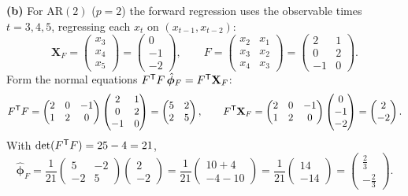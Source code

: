 \documentclass[11pt]{article}
\begin{document}
\textbf{(b)} For $\mathrm{AR}(2)$ ($p=2$) the forward regression uses the
observable times $t=3,4,5$, regressing each $x_t$ on $(x_{t-1},x_{t-2})$:
\[
\mathbf X_F=\begin{pmatrix}x_3\\ x_4\\ x_5\end{pmatrix}=\begin{pmatrix}0\\ -1\\ -2\end{pmatrix},
\qquad
F=\begin{pmatrix}x_2 & x_1\\ x_3 & x_2\\ x_4 & x_3\end{pmatrix}
=\begin{pmatrix}2 & 1\\ 0 & 2\\ -1 & 0\end{pmatrix}.
\]
Form the normal equations $F^{\mathsf{T}} F\,\hat{\boldsymbol\phi}_F=F^{\mathsf{T}}\mathbf X_F$:
\[
F^{\mathsf{T}} F=\begin{pmatrix}2 & 0 & -1\\ 1 & 2 & 0\end{pmatrix}
\begin{pmatrix}2 & 1\\ 0 & 2\\ -1 & 0\end{pmatrix}
=\begin{pmatrix}5 & 2\\ 2 & 5\end{pmatrix},
\qquad
F^{\mathsf{T}}\mathbf X_F=\begin{pmatrix}2 & 0 & -1\\ 1 & 2 & 0\end{pmatrix}
\begin{pmatrix}0\\ -1\\ -2\end{pmatrix}
=\begin{pmatrix}2\\ -2\end{pmatrix}.
\]
With $\det(F^{\mathsf{T}} F)=25-4=21$,
\[
\hat{\boldsymbol\phi}_F=\frac{1}{21}\begin{pmatrix}5 & -2\\ -2 & 5\end{pmatrix}
\begin{pmatrix}2\\ -2\end{pmatrix}
=\frac{1}{21}\begin{pmatrix}10+4\\ -4-10\end{pmatrix}
=\frac{1}{21}\begin{pmatrix}14\\ -14\end{pmatrix}
=\begin{pmatrix}\tfrac23\\[2pt] -\tfrac23\end{pmatrix}.
\]
\end{document}
